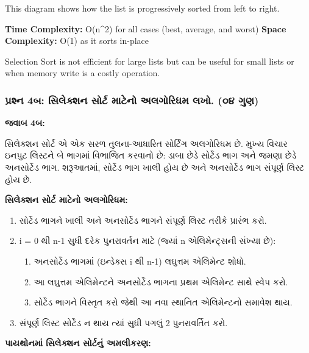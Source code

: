 This diagram shows how the list is progressively sorted from left to
right.

\textbf{Time Complexity:} O(n\^{}2) for all cases (best, average, and
worst) \textbf{Space Complexity:} O(1) as it sorts in-place

Selection Sort is not efficient for large lists but can be useful for
small lists or when memory write is a costly operation.

\hypertarget{uxaaauxab0uxab6uxaa8-4uxaac-uxab8uxab2uxa95uxab6uxaa8-uxab8uxab0uxa9f-uxaaeuxa9fuxaa8-uxa85uxab2uxa97uxab0uxaa7uxaae-uxab2uxa96.-uxae6uxaea-uxa97uxaa3}{%
\subsubsection{પ્રશ્ન 4બ: સિલેક્શન સોર્ટ માટેનો અલગોરિધમ લખો. (૦૪
ગુણ)}\label{uxaaauxab0uxab6uxaa8-4uxaac-uxab8uxab2uxa95uxab6uxaa8-uxab8uxab0uxa9f-uxaaeuxa9fuxaa8-uxa85uxab2uxa97uxab0uxaa7uxaae-uxab2uxa96.-uxae6uxaea-uxa97uxaa3}}

\textbf{જવાબ 4બ:}

સિલેક્શન સોર્ટ એ એક સરળ તુલના-આધારિત સોર્ટિંગ અલગોરિધમ છે. મુખ્ય વિચાર ઇનપુટ લિસ્ટને
બે ભાગમાં વિભાજિત કરવાનો છે: ડાબા છેડે સોર્ટેડ ભાગ અને જમણા છેડે અનસોર્ટેડ ભાગ.
શરૂઆતમાં, સોર્ટેડ ભાગ ખાલી હોય છે અને અનસોર્ટેડ ભાગ સંપૂર્ણ લિસ્ટ હોય છે.

\textbf{સિલેક્શન સોર્ટ માટેનો અલગોરિધમ:}

\begin{enumerate}
\def\labelenumi{\arabic{enumi}.}
\tightlist
\item
  સોર્ટેડ ભાગને ખાલી અને અનસોર્ટેડ ભાગને સંપૂર્ણ લિસ્ટ તરીકે પ્રારંભ કરો.
\item
  i = 0 થી n-1 સુધી દરેક પુનરાવર્તન માટે (જ્યાં n એલિમેન્ટ્સની સંખ્યા છે):

  \begin{enumerate}
  \def\labelenumii{\alph{enumii}.}
  \tightlist
  \item
    અનસોર્ટેડ ભાગમાં (ઇન્ડેક્સ i થી n-1) લઘુત્તમ એલિમેન્ટ શોધો.
  \item
    આ લઘુત્તમ એલિમેન્ટને અનસોર્ટેડ ભાગના પ્રથમ એલિમેન્ટ સાથે સ્વેપ કરો.
  \item
    સોર્ટેડ ભાગને વિસ્તૃત કરો જેથી આ નવા સ્થાનિત એલિમેન્ટનો સમાવેશ થાય.
  \end{enumerate}
\item
  સંપૂર્ણ લિસ્ટ સોર્ટેડ ન થાય ત્યાં સુધી પગલું 2 પુનરાવર્તિત કરો.
\end{enumerate}

\textbf{પાયથોનમાં સિલેક્શન સોર્ટનું અમલીકરણ:}

